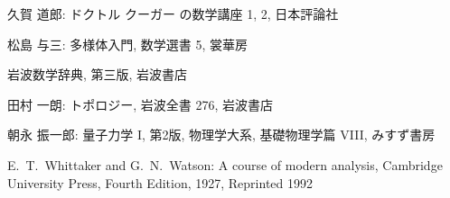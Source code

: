 \documentclass[12pt,twoside]{jarticle}
\begin{document}
\begin{thebibliography}{ABC}




久賀 道郎: ドクトル クーガー の数学講座 1, 2, 日本評論社

松島 与三: 多様体入門, 数学選書 5, 裳華房




岩波数学辞典, 第三版, 岩波書店


田村 一朗: トポロジー, 岩波全書 276, 岩波書店

朝永 振一郎: 量子力学 I, 第2版, 物理学大系, 基礎物理学篇 VIII, みすず書房


E.~T.~Whittaker and G.~N.~Watson: A course of modern analysis,
Cambridge University Press, Fourth Edition, 1927, Reprinted 1992



\end{thebibliography}

\end{document}
